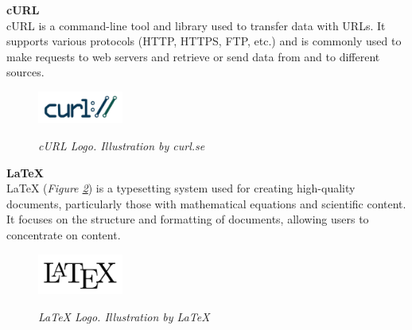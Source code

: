 \vspace{0.5cm}
\textbf{cURL} \\

cURL is a command-line tool and library used to transfer data with URLs.
It supports various protocols (HTTP, HTTPS, FTP, etc.)
and is commonly used to make requests to web servers and retrieve or send data from and to different sources.

\begin{figure}[H]
\centering
\begin{adjustbox}{trim=0cm 0cm, clip}
\includegraphics[width=0.25\textwidth]{imatges/studies_and_decisions/curl-logo.png}
\end{adjustbox}
\caption[cURL Logo]{\textit{cURL Logo. Illustration by curl.se}}
{\label{fig:curl-logo}}
\end{figure}

\vspace{0.5cm}
\textbf{LaTeX} \\

LaTeX (\textit{Figure \ref{fig:latex-logo}}) is a typesetting system used for creating high-quality documents, particularly those with mathematical equations and scientific content. It focuses on the structure and formatting of documents, allowing users to concentrate on content.

\begin{figure}[H]
\centering
\begin{adjustbox}{trim=0cm 0cm, clip}
\includegraphics[width=0.25\textwidth]{imatges/studies_and_decisions/latex-logo.png}
\end{adjustbox}
\caption[LaTeX Logo]{\textit{LaTeX Logo. Illustration by LaTeX}}
{\label{fig:latex-logo}}
\end{figure}
